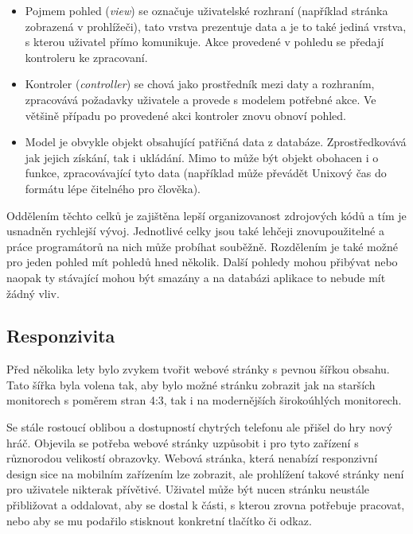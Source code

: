 \begin{itemize}
\item Pojmem pohled (\emph{view}) se označuje uživatelské rozhraní (například stránka zobrazená v prohlížeči), tato vrstva prezentuje data a je to také jediná vrstva, s kterou uživatel přímo komunikuje. Akce provedené v pohledu se předají kontroleru ke zpracovaní.
\item Kontroler (\emph{controller}) se chová jako prostředník mezi daty a rozhraním, zpracovává požadavky uživatele a provede s modelem potřebné akce. Ve většině případu po provedené akci kontroler znovu obnoví pohled.
\item Model je obvykle objekt obsahující patřičná data z databáze. Zprostředkovává jak jejich získání, tak i ukládání. Mimo to může být objekt obohacen i o funkce, zpracovávající tyto data (například může převádět Unixový čas do formátu lépe čitelného pro člověka). 
\end{itemize}


Oddělením těchto celků je zajištěna lepší organizovanost zdrojových kódů a tím je usnadněn rychlejší vývoj. Jednotlivé celky jsou také lehčeji znovupoužitelné a práce programátorů na nich může probíhat souběžně. Rozdělením je také možné pro jeden pohled mít pohledů hned několik. Další pohledy mohou přibývat nebo naopak ty stávající mohou být smazány a na databázi aplikace to nebude mít žádný vliv.

\subsection{Responzivita}
Před několika lety bylo zvykem tvořit webové stránky s pevnou šířkou obsahu. Tato šířka byla volena tak, aby bylo možné stránku zobrazit jak na starších monitorech s poměrem stran 4:3, tak i na modernějších širokoúhlých monitorech. 

Se stále rostoucí oblibou a dostupností chytrých telefonu ale přišel do hry nový hráč. Objevila se potřeba webové stránky uzpůsobit i pro tyto zařízení s různorodou velikostí obrazovky. Webová stránka, která nenabízí responzivní design sice na mobilním zařízením lze zobrazit, ale prohlížení takové stránky není pro uživatele nikterak přívětivé. Uživatel může být nucen stránku neustále přibližovat a oddalovat, aby se dostal k části, s kterou zrovna potřebuje pracovat, nebo aby se mu podařilo stisknout konkretní tlačítko či odkaz. 

